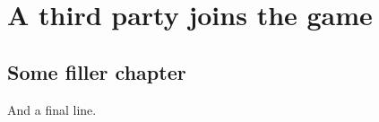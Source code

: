 \documentclass[]{dissertation}
\begin{document}
%
\setcounter{colorcounter}{3}
\part[\color{thumb\arabic{thumbcounter}}A third party joins the game]{A third party joins the game}\label{part:second}
\lipsum[1-3]

\newpage
\chaptoc




\chapter{Some filler chapter}\label{chap:profile}
\lipsum[30-41]

And a final line.






\startcontents[chaps]














%
%

\clearpage
\appendix

%
\setcounter{colorcounter}{4}
\end{document}
